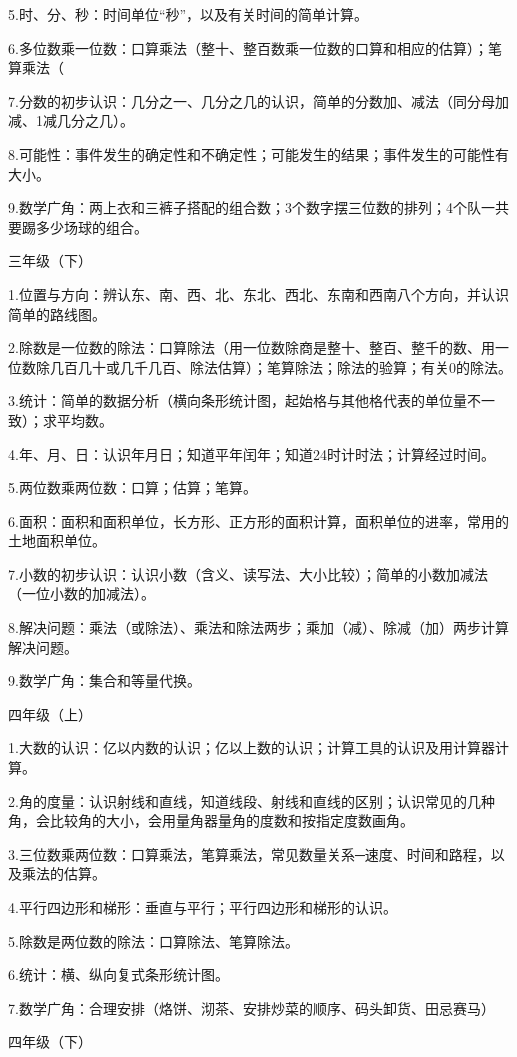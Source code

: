 5.时、分、秒：时间单位“秒”，以及有关时间的简单计算。

6.多位数乘一位数：口算乘法（整十、整百数乘一位数的口算和相应的估算）；笔算乘法（

7.分数的初步认识：几分之一、几分之几的认识，简单的分数加、减法（同分母加减、1减几分之几）。

8.可能性：事件发生的确定性和不确定性；可能发生的结果；事件发生的可能性有大小。

9.数学广角：两上衣和三裤子搭配的组合数；3个数字摆三位数的排列；4个队一共要踢多少场球的组合。

三年级（下）

1.位置与方向：辨认东、南、西、北、东北、西北、东南和西南八个方向，并认识简单的路线图。

2.除数是一位数的除法：口算除法（用一位数除商是整十、整百、整千的数、用一位数除几百几十或几千几百、除法估算）；笔算除法；除法的验算；有关0的除法。

3.统计：简单的数据分析（横向条形统计图，起始格与其他格代表的单位量不一致）；求平均数。

4.年、月、日：认识年月日；知道平年闰年；知道24时计时法；计算经过时间。

5.两位数乘两位数：口算；估算；笔算。

6.面积：面积和面积单位，长方形、正方形的面积计算，面积单位的进率，常用的土地面积单位。

7.小数的初步认识：认识小数（含义、读写法、大小比较）；简单的小数加减法（一位小数的加减法）。

8.解决问题：乘法（或除法）、乘法和除法两步；乘加（减）、除减（加）两步计算解决问题。

9.数学广角：集合和等量代换。

四年级（上）

1.大数的认识：亿以内数的认识；亿以上数的认识；计算工具的认识及用计算器计算。

2.角的度量：认识射线和直线，知道线段、射线和直线的区别；认识常见的几种角，会比较角的大小，会用量角器量角的度数和按指定度数画角。

3.三位数乘两位数：口算乘法，笔算乘法，常见数量关系─速度、时间和路程，以及乘法的估算。

4.平行四边形和梯形：垂直与平行；平行四边形和梯形的认识。

5.除数是两位数的除法：口算除法、笔算除法。

6.统计：横、纵向复式条形统计图。

7.数学广角：合理安排（烙饼、沏茶、安排炒菜的顺序、码头卸货、田忌赛马）

四年级（下）

